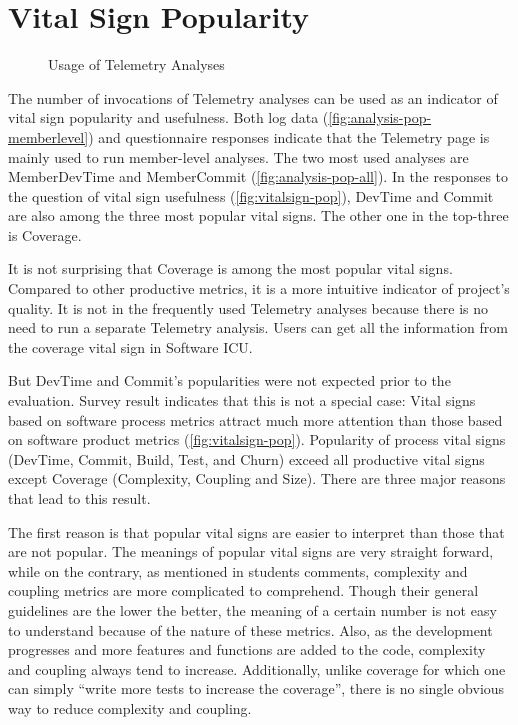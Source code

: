 \section {Vital Sign Popularity}

\begin{figure}[htbp] %
   \centering     
   \vspace{.3in}
   \caption{Usage of Telemetry Analyses}
   \label{fig:analysis-pop}
\end{figure}

The number of invocations of Telemetry analyses can be used as an indicator of vital sign popularity and usefulness. Both log data (\autoref{fig:analysis-pop-memberlevel}) and questionnaire responses indicate that the Telemetry page is mainly used to run member-level analyses. The two most used analyses are MemberDevTime and MemberCommit (\autoref{fig:analysis-pop-all}). In the responses to the question of vital sign usefulness (\autoref{fig:vitalsign-pop}), DevTime and Commit are also among the three most popular vital signs. The other one in the top-three is Coverage. 

It is not surprising that Coverage is among the most popular vital signs. Compared to other productive metrics, it is a more intuitive indicator of project's quality. It is not in the frequently used Telemetry analyses because there is no need to run a separate Telemetry analysis. Users can get all the information from the coverage vital sign in Software ICU.

But DevTime and Commit's popularities were not expected prior to the evaluation. Survey result indicates that this is not a special case: Vital signs based on software process metrics attract much more attention than those based on software product metrics (\autoref{fig:vitalsign-pop}). Popularity of process vital signs (DevTime, Commit, Build, Test, and Churn) exceed all productive vital signs except Coverage (Complexity, Coupling and Size). There are three major reasons that lead to this result. 

The first reason is that popular vital signs are easier to interpret than those that are not popular. The meanings of popular vital signs are very straight forward, while on the contrary, as mentioned in students comments, complexity and coupling metrics are more complicated to comprehend. Though their general guidelines are the lower the better, the meaning of a certain number is not easy to understand because of the nature of these metrics. Also, as the development progresses and more features and functions are added to the code, complexity and coupling always tend to increase. Additionally, unlike coverage for which one can simply ``write more tests to increase the coverage'', there is no single obvious way to reduce complexity and coupling. 

